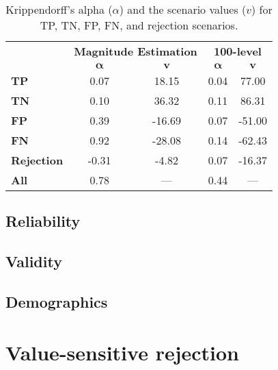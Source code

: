 \begin{table}[t]
    \centering
    \begin{tabular}{lcccc}
        \toprule
                           & \multicolumn{2}{c}{\textbf{Magnitude Estimation}} & \multicolumn{2}{c}{\textbf{100-level}}                                        \\
        \cmidrule(l){2-3} \cmidrule(l){4-5}
                           & $\boldsymbol{\alpha}$                             & $\textbf{v}$                           & $\boldsymbol{\alpha}$ & $\textbf{v}$ \\
        \midrule
        \textbf{TP}        & 0.07                                              & 18.15                                  & 0.04                  & 77.00        \\
        \textbf{TN}        & 0.10                                              & 36.32                                  & 0.11                  & 86.31        \\
        \textbf{FP}        & 0.39                                              & -16.69                                 & 0.07                  & -51.00       \\
        \textbf{FN}        & 0.92                                              & -28.08                                 & 0.14                  & -62.43       \\
        \textbf{Rejection} & -0.31                                             & -4.82                                  & 0.07                  & -16.37       \\
        \midrule
        \textbf{All}       & 0.78                                              & ---                                    & 0.44                  & ---          \\
        \bottomrule
    \end{tabular}
    \caption{Krippendorff's alpha ($\alpha$) and the scenario values ($v$) for TP, TN, FP, FN, and rejection scenarios.}
    \label{tab:values-reliability}
\end{table}

\subsection{Reliability}

\subsection{Validity}

\subsection{Demographics}

\section{Value-sensitive rejection}
